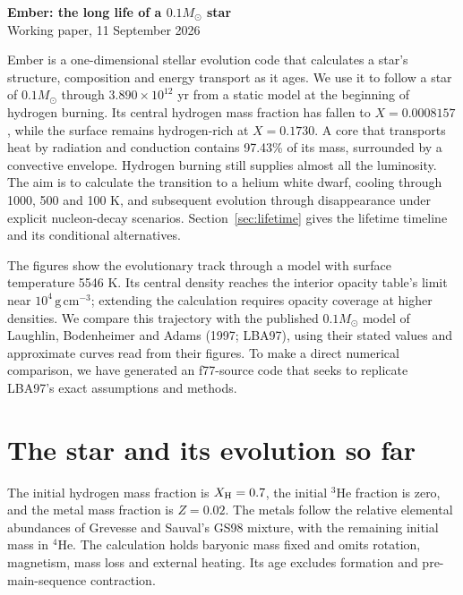 \documentclass[11pt,letterpaper]{article}
\newcommand{\Ms}{M_\odot}\newcommand{\Rs}{R_\odot}\newcommand{\Ls}{L_\odot}
\begin{document}
\begin{center}
{\Large\bfseries Ember: the long life of a $0.1\Ms$ star}\\[8pt]
{\small Working paper, 11 September 2026}
\end{center}

Ember is a one-dimensional stellar evolution code that calculates a star's
structure, composition and energy transport as it ages.
We use it to follow a star of $0.1\Ms$ through
$3.890\times10^{12}$ yr from a static model at the beginning of hydrogen
burning. Its central hydrogen mass fraction has fallen to $X=0.0008157$, while the
surface remains hydrogen-rich at $X=0.1730$. A core that transports heat by
radiation and conduction contains 97.43\% of its mass, surrounded by a convective envelope. Hydrogen
burning still supplies almost all the luminosity. The aim is to calculate the
transition to a helium white dwarf, cooling through 1000, 500 and 100 K,
and subsequent evolution through disappearance under explicit nucleon-decay
scenarios. Section~\ref{sec:lifetime} gives the lifetime timeline and its
conditional alternatives.

The figures show the evolutionary track through a model with surface
temperature 5546 K. Its central density reaches the interior opacity
table's limit near $10^4\,\mathrm{g\,cm^{-3}}$; extending the calculation
requires opacity coverage at higher densities.
We compare this trajectory with the published $0.1\Ms$ model of Laughlin,
Bodenheimer and Adams (1997; LBA97), using their stated values and approximate
curves read from their figures. To make a direct numerical comparison, we have
generated an f77-source code that seeks to replicate LBA97's exact assumptions
and methods.

\section{The star and its evolution so far}
The initial hydrogen mass fraction is $X_{\rm H}=0.7$, the initial $^3$He
fraction is zero, and the metal mass fraction is $Z=0.02$. The metals follow
the relative elemental abundances of Grevesse and Sauval's GS98 mixture, with
the remaining initial mass in $^4$He. The calculation holds baryonic mass fixed and omits rotation,
magnetism, mass loss and external heating. Its age excludes formation and
pre-main-sequence contraction.
\end{document}
